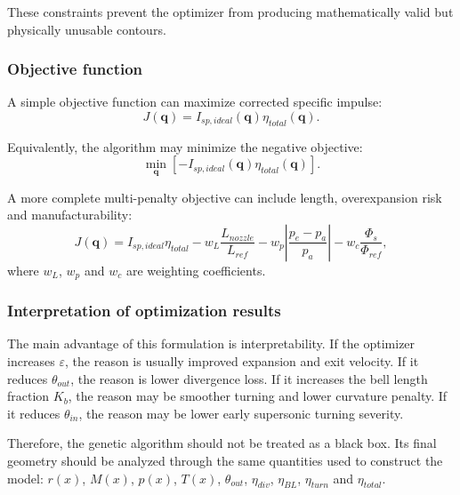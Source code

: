 \documentclass[journal,article,submit,oneauthor]{Definitions/mdpi}
\begin{document}
These constraints prevent the optimizer from producing mathematically valid but physically unusable contours.

\subsubsection{Objective function}

A simple objective function can maximize corrected specific impulse:
\begin{equation}
J(\bm{q})=I_{sp,ideal}(\bm{q})\eta_{total}(\bm{q}).
\label{eq:objective_Isp}
\end{equation}

Equivalently, the algorithm may minimize the negative objective:
\begin{equation}
\min_{\bm{q}}\left[-I_{sp,ideal}(\bm{q})\eta_{total}(\bm{q})\right].
\end{equation}

A more complete multi-penalty objective can include length, overexpansion risk and manufacturability:
\begin{equation}
J(\bm{q})=I_{sp,ideal}\eta_{total}
-w_L\frac{L_{nozzle}}{L_{ref}}
-w_p\left|\frac{p_e-p_a}{p_a}\right|
-w_c\frac{\Phi_s}{\Phi_{ref}},
\label{eq:objective_full}
\end{equation}
where $w_L$, $w_p$ and $w_c$ are weighting coefficients.

\subsubsection{Interpretation of optimization results}

The main advantage of this formulation is interpretability. If the optimizer increases $\varepsilon$, the reason is usually improved expansion and exit velocity. If it reduces $\theta_{out}$, the reason is lower divergence loss. If it increases the bell length fraction $K_b$, the reason may be smoother turning and lower curvature penalty. If it reduces $\theta_{in}$, the reason may be lower early supersonic turning severity.

Therefore, the genetic algorithm should not be treated as a black box. Its final geometry should be analyzed through the same quantities used to construct the model: $r(x)$, $M(x)$, $p(x)$, $T(x)$, $\theta_{out}$, $\eta_{div}$, $\eta_{BL}$, $\eta_{turn}$ and $\eta_{total}$.

\end{document}
